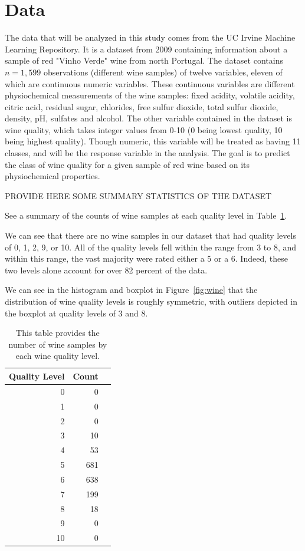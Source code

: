 \documentclass[12pt]{article}
\begin{document}
\section{Data}
\label{sec:data}

The data that will be analyzed in this study comes from the UC Irvine Machine 
Learning Repository.  It is a dataset from 2009 containing information about 
a sample of red "Vinho Verde" wine from north Portugal.  The dataset contains 
$n = 1,599$ observations (different wine samples) of twelve variables, eleven 
of which are continuous numeric variables.  These continuous variables are 
different physiochemical measurements of the wine samples: fixed acidity, 
volatile acidity, citric acid, residual sugar, chlorides, free sulfur dioxide, 
total sulfur dioxide, density, pH, sulfates and alcohol.  The other variable 
contained in the dataset is wine quality, which takes integer values from 0-10 
(0 being lowest quality, 10 being highest quality).  Though numeric, this 
variable will be treated as having 11 classes, and will be the response variable 
in the analysis.  The goal is to predict the class of wine quality for a given 
sample of red wine based on its physiochemical properties.  

PROVIDE HERE SOME SUMMARY STATISTICS OF THE DATASET

See a summary of the counts of wine samples at each quality level in 
Table~\ref{tab:qual}.

We can see that there are no wine samples in our dataset that had quality 
levels of 0, 1, 2, 9, or 10.  All of the quality levels fell within the 
range from 3 to 8, and within this range, the vast majority were rated 
either a 5 or a 6.  Indeed, these two levels alone account for over 82 
percent of the data.  

We can see in the histogram and boxplot in Figure~\ref{fig:wine} that 
the distribution of wine quality levels is roughly symmetric, with 
outliers depicted in the boxplot at quality levels of 3 and 8.  

\begin{table}[tbp]
 \caption{This table provides the number of wine samples by each wine quality level.}
\label{tab:qual}
\centering
\begin{tabular}{rrr}
 \toprule
 Quality Level & Count \\ 
 \midrule
0 & 0 \\ 
1 & 0 \\ 
2 & 0 \\ 
3 & 10 \\ 
4 & 53 \\ 
5 & 681 \\ 
6 & 638 \\ 
7 & 199 \\ 
8 & 18 \\ 
9 & 0 \\ 
10 & 0 \\
\bottomrule
\end{tabular}
\end{table}
\end{document}
